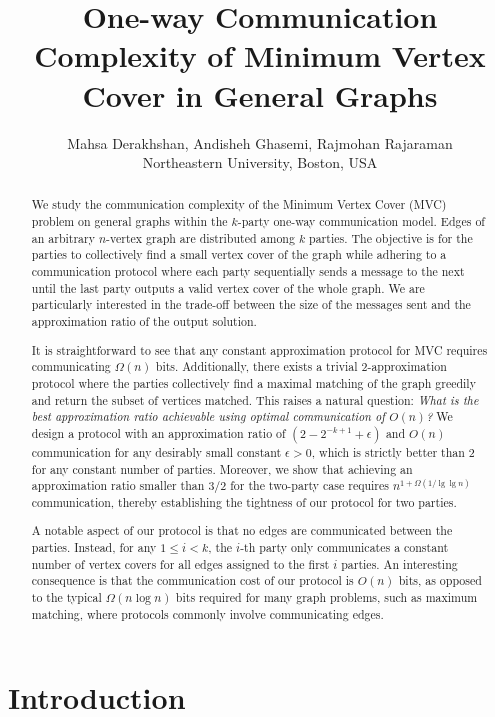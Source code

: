 \documentclass[11pt]{article}
\title{One-way Communication Complexity of Minimum Vertex Cover in General Graphs}
\author{
Mahsa Derakhshan, Andisheh Ghasemi, Rajmohan Rajaraman\\
Northeastern University, Boston, USA
}
\date{}
\begin{document}
\maketitle

\begin{abstract}
We study the communication complexity of the Minimum Vertex Cover (MVC) problem on general graphs within the \(k\)-party one-way communication model. Edges of an arbitrary \(n\)-vertex graph are distributed among \(k\) parties. The objective is for the parties to collectively find a small vertex cover of the graph while adhering to a communication protocol where each party sequentially sends a message to the next until the last party outputs a valid vertex cover of the whole graph. We are particularly interested in the trade-off between the size of the messages sent and the approximation ratio of the output solution.

It is straightforward to see that any constant approximation protocol for MVC requires communicating \(\Omega(n)\) bits. Additionally, there exists a trivial 2-approximation protocol where the parties collectively find a maximal matching of the graph greedily and return the subset of vertices matched. This raises a natural question: \textit{What is the best approximation ratio achievable using optimal communication of \(O(n)\)?} We design a protocol with an approximation ratio of \((2-2^{-k+1}+\epsilon)\) and \(O(n)\) communication for any desirably small constant \(\epsilon>0\), which is strictly better than 2 for any constant number of parties. Moreover, we show that achieving an approximation ratio smaller than \(3/2\) for the two-party case requires \(n^{1 + \Omega(1/\lg\lg n)}\) communication, thereby establishing the tightness of our protocol for two parties.

A notable aspect of our protocol is that no edges are communicated between the parties. Instead, for any \(1 \leq i < k\), the \(i\)-th party only communicates a constant number of vertex covers for all edges assigned to the first $i$ parties. An interesting consequence is that the communication cost of our protocol is \(O(n)\) bits, as opposed to the typical \(\Omega(n\log n)\) bits required for many graph problems, such as maximum matching, where protocols commonly involve communicating edges.





 \end{abstract}

\section{Introduction}\label{sec2}
\end{document}
